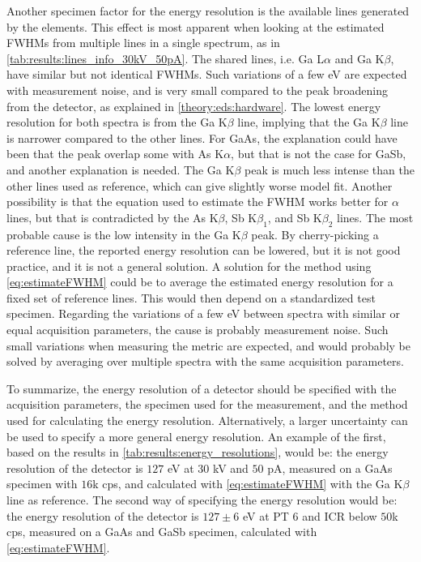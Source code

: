 Another specimen factor for the energy resolution is the available lines generated by the elements.
This effect is most apparent when looking at the estimated FWHMs from multiple lines in a single spectrum, as in \cref{tab:results:lines_info_30kV_50pA}.
The shared lines, i.e. Ga L$\alpha$ and Ga K$\beta$, have similar but not identical FWHMs.
Such variations of a few eV are expected with measurement noise, and is very small compared to the peak broadening from the detector, as explained in \cref{theory:eds:hardware}.
The lowest energy resolution for both spectra is from the Ga K$\beta$ line, implying that the Ga K$\beta$ line is narrower compared to the other lines.
For GaAs, the explanation could have been that the peak overlap some with As K$\alpha$, but that is not the case for GaSb, and another explanation is needed.
The Ga K$\beta$ peak is much less intense than the other lines used as reference, which can give slightly worse model fit.
Another possibility is that the equation used to estimate the FWHM works better for $\alpha$ lines, but that is contradicted by the As K$\beta$, Sb K$\beta_1$, and Sb K$\beta_2$ lines.
The most probable cause is the low intensity in the Ga K$\beta$ peak.
By cherry-picking a reference line, the reported energy resolution can be lowered, but it is not good practice, and it is not a general solution.
A solution for the method using \cref{eq:estimateFWHM} could be to average the estimated energy resolution for a fixed set of reference lines.
This would then depend on a standardized test specimen.
Regarding the variations of a few eV between spectra with similar or equal acquisition parameters, the cause is probably measurement noise.
Such small variations when measuring the metric are expected, and would probably be solved by averaging over multiple spectra with the same acquisition parameters.


To summarize, the energy resolution of a detector should be specified with the acquisition parameters, the specimen used for the measurement, and the method used for calculating the energy resolution.
Alternatively, a larger uncertainty can be used to specify a more general energy resolution.
An example of the first, based on the results in \cref{tab:results:energy_resolutions}, would be:  the energy resolution of the detector is $127$ eV at $30$ kV and $50$ pA, measured on a GaAs specimen with $16$k cps, and calculated with \cref{eq:estimateFWHM} with the Ga K$\beta$ line as reference.
The second way of specifying the energy resolution would be: the energy resolution of the detector is $127 \pm 6$ eV at PT $6$ and ICR below $50$k cps, measured on a GaAs and GaSb specimen, calculated with \cref{eq:estimateFWHM}.



